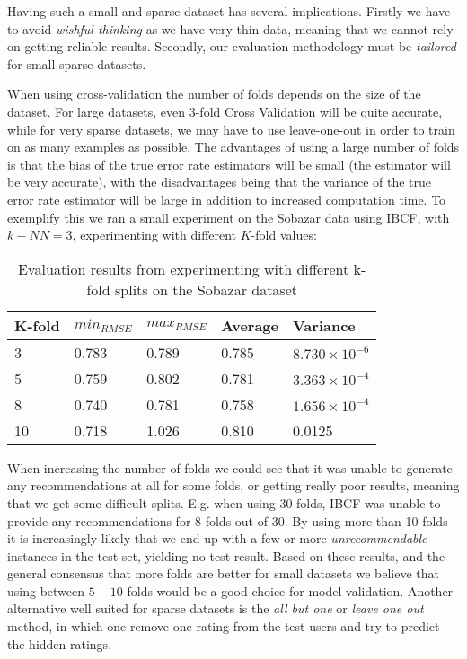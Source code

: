 Having such a small and sparse dataset has several implications. Firstly we have to avoid \emph{wishful thinking} as we have very thin data, meaning that we cannot rely on getting reliable results. Secondly, our evaluation methodology must be \emph{tailored} for small sparse datasets.

When using cross-validation the number of folds depends on the size of the dataset. For large datasets, even 3-fold Cross Validation will be quite accurate, while for very sparse datasets, we may have to use leave-one-out in order to train on as many examples as possible. The advantages of using a large number of folds is that the bias of the true error rate estimators will be small (the estimator will be very accurate), with the disadvantages being that the variance of the true error rate estimator will be large in addition to increased computation time. To exemplify this we ran a small experiment on the Sobazar data using IBCF, with $k-NN=3$, experimenting with different $K$-fold values:

\begin{table}[H]
\centering
\begin{tabular}{|l|l|l|l|l|}
\hline
K-fold & 	$min_{RMSE}$ 	&	$max_{RMSE}$ 	& Average 	& Variance 					\\ \hline
3	   & 	0.783 			& 	0.789 			& 0.785 	& $8.730 \times 10^{-6}$	\\ \hline
5	   & 	0.759			& 	0.802 			& 0.781 	& $3.363 \times 10^{-4}$ 	\\ \hline
8	   & 	0.740			& 	0.781			& 0.758 	& $1.656 \times 10^{-4}$ 	\\ \hline
10	   & 	0.718 			& 	1.026			& 0.810  	& 0.0125					\\ \hline
\end{tabular}
\caption{Evaluation results from experimenting with different k-fold splits on the Sobazar dataset}
\end{table}

When increasing the number of folds we could see that it was unable to generate any recommendations at all for some folds, or getting really poor results, meaning that we get some difficult splits. E.g. when using 30 folds, IBCF was unable to provide any recommendations for 8 folds out of 30. By using more than 10 folds it is increasingly likely that we end up with a few or more   \emph{unrecommendable} instances in the test set, yielding no test result. Based on these results, and the general consensus that more folds are better for small datasets we believe that using between $5-10$-folds would be a good choice for model validation. Another alternative well suited for sparse datasets is the \emph{all but one} or \emph{leave one out} method, in which one remove one rating from the test users and try to predict the hidden ratings.

